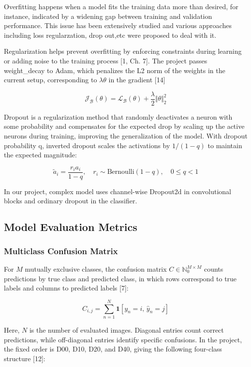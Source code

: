 \documentclass[11pt,a4paper]{article}
\begin{document}
Overfitting happens when a model fits the training data more than desired, for instance, indicated by a widening gap between training and validation performance. This issue has been extensively studied and various approaches including loss regularzation, drop out,etc were proposed to deal with it.

Regularization helps prevent overfitting by enforcing constraints during learning or adding noise to the training process [1, Ch. 7]. The project passes weight\_decay to Adam, which penalizes the L2 norm of the weights in the current setup, corresponding to \(\lambda \theta \) in the gradient [14]

\[
{\mathcal{J}}_{\mathcal{B}}(\theta )={\mathcal{L}}_{\mathcal{B}}(\theta )+\frac{\lambda }{2}\Vert \theta {\Vert }_{2}^{2}
\]

Dropout is a regularization method that randomly deactivates a neuron with some probability and compensates for the expected drop by scaling up the active neurons during training, improving the generalization of the model. With dropout probability q, inverted dropout scales the activations by \(1/(1-q)\) to maintain the expected magnitude:

\[
{\tilde{a}}_{i}=\frac{{r}_{i}{a}_{i}}{1-q},\quad {r}_{i}\sim \mathrm{Bernoulli}(1-q),\quad 0\le q<1
\]

In our project, complex model uses channel-wise Dropout2d in convolutional blocks and ordinary dropout in the classifier.

\subsection{Model Evaluation Metrics}\label{theory:2.4}

\subsubsection{Multiclass Confusion Matrix}\label{theory:2.4.1}

For \(M\) mutually exclusive classes, the confusion matrix \(C\in {\mathbb{N}}_{0}^{M\times M}\) counts predictions by true class and predicted class, in which rows correspond to true labels and columns to predicted labels [7]:

\[
{C}_{i,j}=\sum _{n=1}^{N} \boldsymbol{1}[{y}_{n}=i,\,{\hat{y}}_{n}=j]
\]

Here, \(N\) is the number of evaluated images. Diagonal entries count correct predictions, while off-diagonal entries identify specific confusions. In the project, the fixed order is D00, D10, D20, and D40, giving the following four-class structure [12]:
\end{document}
